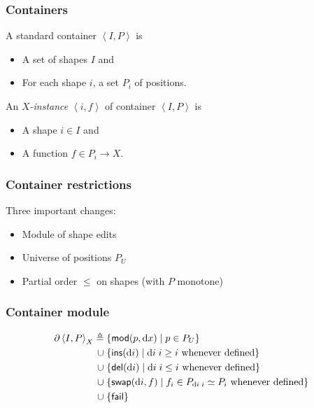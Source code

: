 \documentclass[table]{beamer}
\begin{document}
\begin{frame}
    \frametitle{Containers}
    A standard container $\left<I,P\right>$ is
    \begin{itemize}
        \item A set of shapes $I$ and
        \item For each shape $i$, a set $P_i$ of positions.
    \end{itemize}
    An \emph{$X$-instance} $\left<i,f\right>$ of container $\left<I,P\right>$ is
    \begin{itemize}
        \item A shape $i \in I$ and
        \item A function $f \in P_i \to X$.
    \end{itemize}
\end{frame}

\begin{frame}
    \frametitle{Container restrictions}
    Three important changes:

    \begin{itemize}
        \item Module of shape edits
        \item Universe of positions $P_U$
        \item Partial order $\le$ on shapes (with $P$ monotone)
    \end{itemize}
\end{frame}


\begin{frame}
    \frametitle{Container module}
    \begin{align*}
        \partial\left<I,P\right>_X
            \triangleq{}&
                \{\mathsf{mod}(p,\textrm{d} x) \mid p \in P_U\}
            \\ \mathrel{\cup}{}&
                \{\mathsf{ins}(\textrm{d} i) \mid \textrm{d} i\;i \ge i\mbox{ whenever defined}\}
            \\ \mathrel{\cup}{}&
                \{\mathsf{del}(\textrm{d} i) \mid \textrm{d} i\;i \le i\mbox{ whenever defined}\}
            \\ \mathrel{\cup}{}&
                \{\mathsf{swap}(\textrm{d} i,f) \mid f_i \in P_{\textrm{d} i\;i} \simeq P_i
                \mbox{ whenever defined} \}
            \\ \mathrel{\cup}{}&
                \{\mathsf{fail}\}
    \end{align*}
\end{frame}
\end{document}
